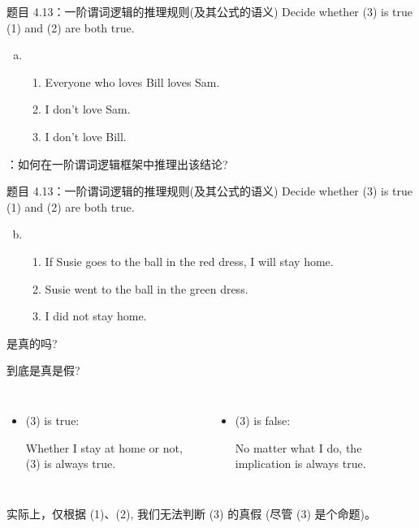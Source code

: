 \begin{frame}{}
  \begin{exampleblock}{题目 4.13：一阶谓词逻辑的推理规则(及其公式的语义)}
    Decide whether (3) is true  (1) and (2) are both true.

    \begin{enumerate}[(a)]
      \item 
	\begin{enumerate}[(1)]
	  \item Everyone who loves Bill loves Sam.
	  \item I don't love Sam.
	  \item I don't love Bill.
	\end{enumerate}
    \end{enumerate}
  \end{exampleblock}

  \vspace{0.50cm}
  \pause
  \centerline{：如何在一阶谓词逻辑框架中推理出该结论?}
\end{frame}

\begin{frame}{}
  \begin{exampleblock}{题目 4.13：一阶谓词逻辑的推理规则(及其公式的语义)}
    Decide whether (3) is true  (1) and (2) are both true.

    \begin{enumerate}[(a)]
      \setcounter{enumi}{1}
      \item 
	\begin{enumerate}[(1)]
	  \item If Susie goes to the ball in the red dress, I will stay home.
	  \item Susie went to the ball in the green dress.
	  \item I did not stay home.
	\end{enumerate}
    \end{enumerate}
  \end{exampleblock}

  \centerline{是真的吗?}

  \pause
  \vspace{0.30cm}
  到底是真是假?
  \vspace{0.30cm}
  \begin{columns}
      \begin{itemize}
	\item (3) is true:

	Whether I stay at home or not, (3) is always true.
      \end{itemize}
      \begin{itemize}
        \item (3) is false:

	No matter what I do, the implication is always true.
      \end{itemize}
  \end{columns}

  \pause
  \vspace{0.50cm}
  实际上，仅根据 (1)、(2), 我们无法判断 (3) 的真假 (尽管 (3) 是个命题)。
\end{frame}

